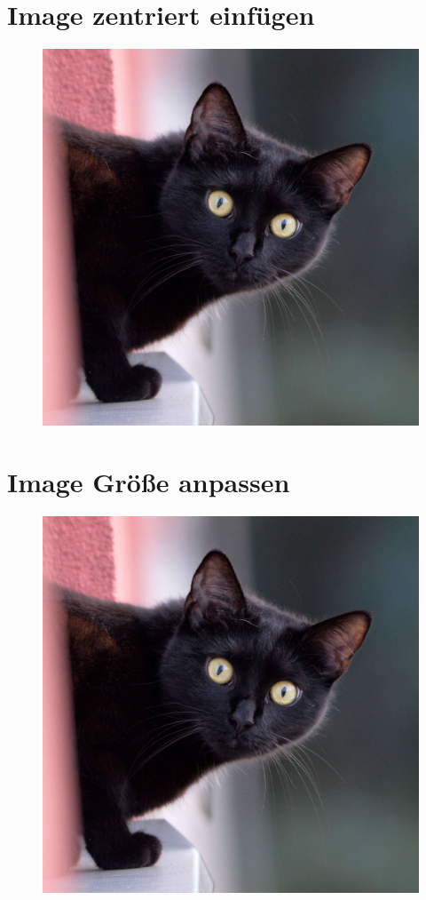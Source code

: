 \documentclass{scrarticle}
\begin{document}
	\section{Image zentriert einfügen}
	\begin{figure}[h!hbt]
		\centering
		\includegraphics[width=\linewidth]{./Abbildungen/Beispiel.jpg}
	\end{figure}
	\newpage
	
	\section{Image Größe anpassen}
	\begin{figure}[h!hbt]
		\includegraphics[width=0.5\linewidth, height=0.3\textheight]{./Abbildungen/Beispiel.jpg}
	\end{figure}	
	\newpage
	
\end{document}
